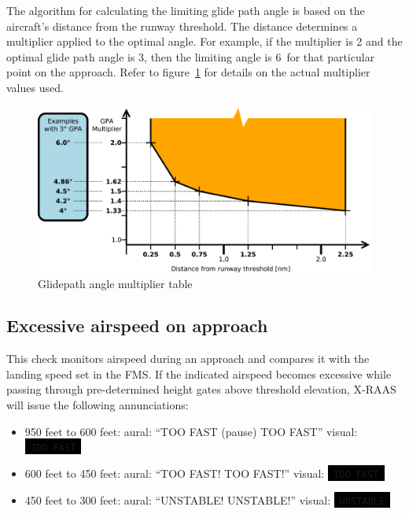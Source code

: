 \documentclass[a4paper,12pt]{article}
\newcommand{\visualadvisory}[3][b]{%
    \ifthenelse{\equal{#1}{b}}{\begin{center}}{}
    \noindent
    \colorbox{black}{\textcolor{#2visualadvisorycolor}{\large\texttt{~#3~}}}
    \ifthenelse{\equal{#1}{b}}{\end{center}}{}}
\begin{document}
\noindent The algorithm for calculating the limiting glide path angle is
based on the aircraft's distance from the runway threshold. The distance
determines a multiplier applied to the optimal angle. For example, if the
multiplier is 2 and the optimal glide path angle is 3\degree, then the
limiting angle is 6\degree\ for that particular point on the approach.
Refer to figure~\ref{fig:GPATable} for details on the actual multiplier
values used.

\begin{figure}[H]
\begin{center}
\includegraphics[width=\textwidth]{../src/gpa_mult_table.pdf}
\end{center}
\caption{Glidepath angle multiplier table}
\label{fig:GPATable}
\end{figure}

\subsection{Excessive airspeed on approach}
\label{subsec:TooFastMon}

This check monitors airspeed during an approach and compares it with the
landing speed set in the FMS. If the indicated airspeed becomes excessive
while passing through pre-determined height gates above threshold
elevation, X-RAAS will issue the following annunciations:

\begin{itemize}

\item 950 feet to 600 feet: aural: ``TOO FAST (pause) TOO FAST''
visual:\visualadvisory[i]{nonroutine}{TOO FAST}

\item 600 feet to 450 feet: aural: ``TOO FAST! TOO FAST!''
visual:\visualadvisory[i]{nonroutine}{TOO FAST}

\item 450 feet to 300 feet: aural: ``UNSTABLE! UNSTABLE!''
visual:\visualadvisory[i]{nonroutine}{UNSTABLE}

\end{itemize}
\end{document}
